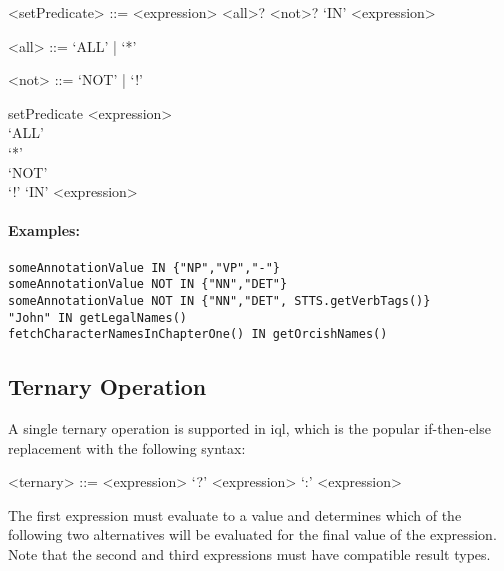 \documentclass[11pt,a4paper]{report}
\begin{document}
\begin{gram}
	\label{gram:set-predicate}
	\begin{grammar}	
		<setPredicate> ::= <expression> <all>? <not>? `IN' <expression>
		
		<all> ::=  `ALL' | `*'
		
		<not> ::=  `NOT' | `!'
	\end{grammar}
	\diagsep
	
	\begin{rrdiag*}{setPredicate}
		<expression> \sst \\ `ALL' \\ `*' \est \sst \\ `NOT' \\ `!' \est `IN' <expression>
	\end{rrdiag*}
\end{gram}

\paragraph{Examples:}

\begin{Verbatim}[samepage=true]
someAnnotationValue IN {"NP","VP","-"}
someAnnotationValue NOT IN {"NN","DET"}
someAnnotationValue NOT IN {"NN","DET", STTS.getVerbTags()}
"John" IN getLegalNames()
fetchCharacterNamesInChapterOne() IN getOrcishNames()
\end{Verbatim}

\subsection{Ternary Operation}
\label{sec:ternary-operation}

A single ternary operation is supported in \ac{iql}, which is the popular if-then-else replacement with the following syntax:

\begin{gram}
	\label{gram:ternary-operations}
	\begin{grammar}	
		<ternary> ::= <expression> `?' <expression> `:' <expression>
	\end{grammar}
\end{gram}

\noindent The first expression must evaluate to a  value and determines which of the following two alternatives will be evaluated for the final value of the expression. Note that the second and third expressions must have compatible result types.
\end{document}
